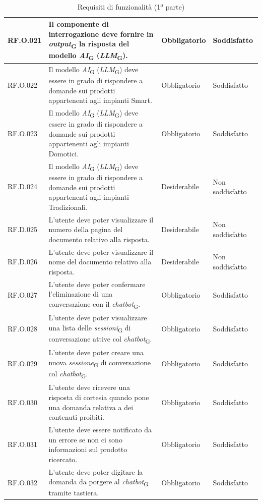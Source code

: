 \begin{table}[H]
\centering
    \begin{tabular}{|C{2.7cm}|L{6.5cm}|C{2.7cm}|C{2.7cm}|}
        \hline
        RF.O.021 & Il componente di interrogazione deve fornire in \textit{output}\textsubscript{G} la risposta del modello \textit{AI}\textsubscript{G} (\textit{LLM}\textsubscript{G}).
         & Obbligatorio & Soddisfatto \\
        \hline
        RF.O.022 & Il modello \textit{AI}\textsubscript{G} (\textit{LLM}\textsubscript{G}) deve essere in grado di rispondere a domande sui prodotti appartenenti agli impianti Smart.
         & Obbligatorio & Soddisfatto \\
        \hline
        RF.O.023 & Il modello \textit{AI}\textsubscript{G} (\textit{LLM}\textsubscript{G}) deve essere in grado di rispondere a domande sui prodotti appartenenti agli impianti Domotici.
         & Obbligatorio & Soddisfatto \\
         \hline
        RF.D.024 & Il modello \textit{AI}\textsubscript{G} (\textit{LLM}\textsubscript{G}) deve essere in grado di rispondere a domande sui prodotti appartenenti agli impianti Tradizionali.
         & Desiderabile & Non soddisfatto \\
         \hline
        RF.D.025 & L’utente deve poter visualizzare il numero della pagina del documento relativo alla risposta.
        & Desiderabile & Non soddisfatto \\
        \hline
        RF.D.026 & L’utente deve poter visualizzare il nome del documento relativo alla
        risposta.
         & Desiderabile & Non soddisfatto \\
        \hline
        RF.O.027 & L’utente deve poter confermare l'eliminazione di una conversazione con il \textit{chatbot}\textsubscript{G}.
         & Obbligatorio & Soddisfatto \\
        \hline

        RF.O.028 & L’utente deve poter visualizzare una lista delle
        \textit{sessioni}\textsubscript{G} di conversazione attive col \textit{chatbot}\textsubscript{G}.
         & Obbligatorio & Soddisfatto \\
        \hline
        RF.O.029 & L’utente deve poter creare una nuova \textit{sessione}\textsubscript{G} di conversazione col \textit{chatbot}\textsubscript{G}.
         & Obbligatorio & Soddisfatto \\
        \hline
        RF.O.030 & L’utente deve ricevere una risposta di cortesia quando pone una domanda relativa a dei contenuti proibiti.
         & Obbligatorio & Soddisfatto \\
        \hline
        RF.O.031 & L'utente deve essere notificato da un errore se non ci sono informazioni sul prodotto ricercato. & Obbligatorio & Soddisfatto \\
        \hline
        RF.O.032 & L’utente deve poter digitare la domanda da porgere al \textit{chatbot}\textsubscript{G} tramite tastiera.
         & Obbligatorio & Soddisfatto \\
        \hline
        \end{tabular}
    \caption{Requisiti di funzionalità (1\textsuperscript{a}  parte)}
\end{table}
